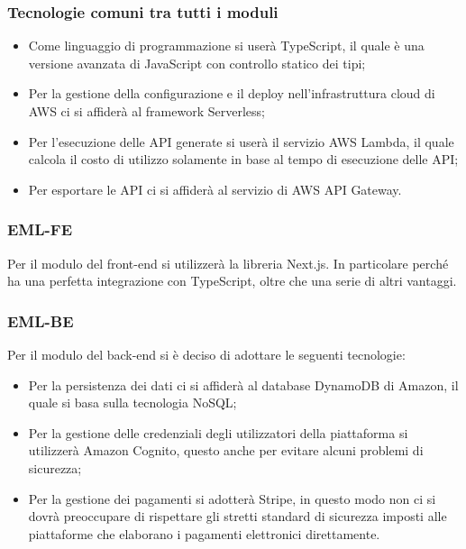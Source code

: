 \subsubsection{Tecnologie comuni tra tutti i moduli}
\begin{itemize}
	\item Come linguaggio di programmazione si userà TypeScript, il quale è una versione avanzata di JavaScript con controllo statico dei tipi;
	\item Per la gestione della configurazione e il deploy nell'infrastruttura cloud di AWS ci si affiderà al framework Serverless;
	\item Per l'esecuzione delle API generate si userà il servizio AWS Lambda, il quale calcola il costo di utilizzo solamente in base al tempo di esecuzione delle API;
	\item Per esportare le API ci si affiderà al servizio di AWS API Gateway.
\end{itemize}

\subsubsection{EML-FE}
Per il modulo del front-end si utilizzerà la libreria Next.js. In particolare perché ha una perfetta integrazione con TypeScript,
oltre che una serie di altri vantaggi.

\subsubsection{EML-BE}
Per il modulo del back-end si è deciso di adottare le seguenti tecnologie:
\begin{itemize}
	\item Per la persistenza dei dati ci si affiderà al database DynamoDB di Amazon, il quale si basa sulla tecnologia NoSQL;
	\item Per la gestione delle credenziali degli utilizzatori della piattaforma si utilizzerà Amazon Cognito, questo anche per evitare alcuni problemi di sicurezza;
	\item Per la gestione dei pagamenti si adotterà Stripe, in questo modo non ci si dovrà preoccupare di rispettare gli stretti standard di sicurezza imposti alle piattaforme che elaborano i pagamenti elettronici direttamente.
\end{itemize}

